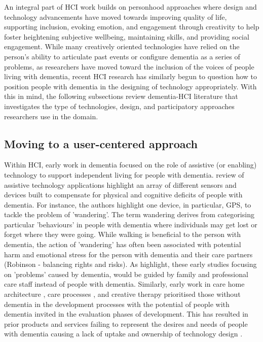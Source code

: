 An integral part of HCI work builds on personhood approaches where design and technology advancements have moved towards improving quality of life, supporting inclusion, evoking emotion, and engagement through creativity to help foster heightening subjective wellbeing, maintaining skills, and providing social engagement. While many creatively oriented technologies have relied on the person's ability to articulate past events or configure dementia as a series of problems, as researchers have moved toward the inclusion of the voices of people living with dementia, recent HCI research has similarly begun to question how to position people with dementia in the designing of technology appropriately. With this in mind, the following subsections review dementia-HCI literature that investigates the type of technologies, design, and participatory approaches researchers use in the domain.

\subsection{Moving to a user-centered approach}
\label{BL:Tech}
Within HCI, early work in dementia focused on the role of assistive (or enabling) technology to support independent living for people with dementia. \cite{bharucha2009intelligent} review of assistive technology applications highlight an array of different sensors and devices built to compensate for physical and cognitive deficits of people with dementia. For instance, the authors highlight one device, in particular, GPS, to tackle the problem of 'wandering'. The term wandering derives from categorising particular 'behaviours' in people with dementia where individuals may get lost or forget where they were going. While walking is beneficial to the person with dementia, the action of 'wandering' has often been associated with potential harm and emotional stress for the person with dementia and their care partners (Robinson - balancing rights and risks). As \cite{bharucha2009intelligent} highlight, these early studies focusing on 'problems' caused by dementia, would be guided by family and professional care staff instead of people with dementia. Similarly, early work in care home architecture \citep{torrington2006has}, care processes \citep{rabins2006practical}, and creative therapy \citep{schmitt2006creative} prioritised those without dementia in the development processes with the potential of people with dementia invited in the evaluation phases of development. This has resulted in prior products and services failing to represent the desires and needs of people with dementia causing a lack of uptake and ownership of technology design \citep{gibson2019personalisation}. 

